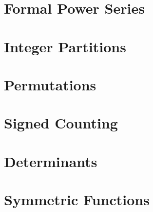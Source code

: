 
\chapter{Formal Power Series}


















\chapter{Integer Partitions}





\chapter{Permutations}






\chapter{Signed Counting}





\chapter{Determinants}






\chapter{Symmetric Functions}






